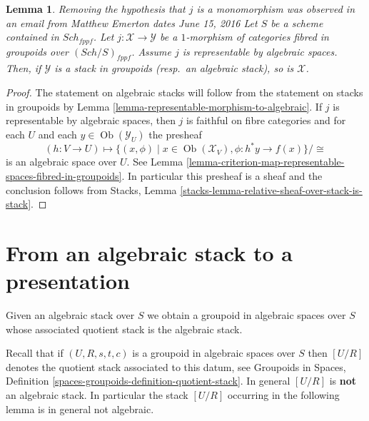 \documentclass{stacks-project}
\newenvironment{reference}{\comment}{\endcomment}
\theoremstyle{plain}
\newtheorem{lemma}[subsection]{Lemma}
\theoremstyle{definition}
\theoremstyle{remark}
\numberwithin{equation}{subsection}
\def\Sch{\mathit{Sch}}
\def\Ob{\mathop{\mathrm{Ob}}\nolimits}
\begin{document}
\begin{lemma}
\label{lemma-open-fibred-category-is-algebraic}
\begin{reference}
Removing the hypothesis that $j$ is a monomorphism was observed
in an email from Matthew Emerton dates June 15, 2016
\end{reference}
Let $S$ be a scheme contained in $\Sch_{fppf}$.
Let $j : \mathcal X \to \mathcal Y$ be a $1$-morphism of
categories fibred in groupoids over $(\Sch/S)_{fppf}$.
Assume $j$ is representable by algebraic spaces.
Then, if $\mathcal{Y}$ is a stack in groupoids
(resp.\ an algebraic stack), so is $\mathcal{X}$.
\end{lemma}

\begin{proof}
The statement on algebraic stacks will follow from the statement on
stacks in groupoids by Lemma \ref{lemma-representable-morphism-to-algebraic}.
If $j$ is representable by algebraic spaces, then $j$ is
faithful on fibre categories and for each $U$ and each
$y \in \Ob(\mathcal{Y}_U)$ the presheaf
$$
(h : V \to U)
\longmapsto
\{(x, \phi) \mid x \in \Ob(\mathcal{X}_V), \phi : h^*y \to f(x)\}/\cong
$$
is an algebraic space over $U$. See
Lemma \ref{lemma-criterion-map-representable-spaces-fibred-in-groupoids}.
In particular this presheaf is a sheaf and the conclusion follows
from Stacks, Lemma \ref{stacks-lemma-relative-sheaf-over-stack-is-stack}.
\end{proof}



\section{From an algebraic stack to a presentation}
\label{section-stack-to-presentation}

\noindent
Given an algebraic stack over $S$ we obtain a groupoid in algebraic spaces
over $S$ whose associated quotient stack is the algebraic stack.

\medskip\noindent
Recall that if $(U, R, s, t, c)$ is a groupoid in algebraic spaces over $S$
then $[U/R]$ denotes the quotient stack associated to this datum, see
Groupoids in Spaces,
Definition \ref{spaces-groupoids-definition-quotient-stack}.
In general $[U/R]$ is {\bf not} an algebraic stack. In particular the
stack $[U/R]$ occurring in the following lemma is in general not
algebraic.
\end{document}
